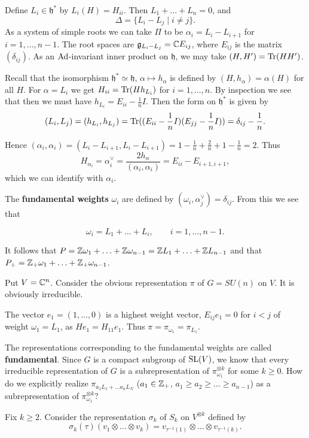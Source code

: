 \documentclass[11pt, english]{article}
\begin{document}
Define $L_i \in \mathfrak{h}^\ast$ by $L_i(H)=H_{ii}$. Then $L_1+\ldots+L_n=0$, and
$$
\Delta = \{ L_i - L_j \mid i \neq j \}.
$$
As a system of simple roots we can take $\Pi$ to be $\alpha_i= L_i-L_{i+1}$ for $i=1,\ldots,n-1$. The root spaces are $\mathfrak g_{L_i-L_j} = \mathbb{C} E_{ij}$, where $E_{ij}$ is the matrix $(\delta_{ij})$. As an $\operatorname{Ad}$-invariant inner product on $\mathfrak h$, we may take $(H,H') = \operatorname{Tr}(HH')$. 

Recall that the isomorphism $\mathfrak h^\ast \simeq \mathfrak h$, $\alpha \mapsto h_\alpha$ is defined by $(H,h_\alpha)=\alpha(H)$ for all $H$. For $\alpha=L_i$ we get $H_{ii} = \operatorname{Tr}(H h_{L_i})$ for $i=1,\ldots,n$. By inspection we see that then we must have $h_{L_i} = E_{ii} - \frac{1}{n}I$. Then the form on $\mathfrak h^\ast$ is given by 
$$
(L_i, L_j) = (h_{L_i}, h_{L_j}) = \operatorname{Tr}( (E_{ii} - \frac 1n I)(E_{jj} - \frac 1n I)) = \delta_{ij} - \frac 1n.
$$

Hence $(\alpha_i,\alpha_i)=(L_i-L_{i+1},L_i-L_{i+1}) = 1-\frac 1n + \frac 2n +1 -\frac 1n=2$. Thus
$$
H_{\alpha_i} = \alpha_i^\vee = \frac{2 h_\alpha}{(\alpha_i,\alpha_i)}=E_{ii}-E_{i+1,i+1},
$$
which we can identify with $\alpha_i$.

The \textbf{fundamental weights} $\omega_i$ are defined by $(\omega_i, \alpha_j^\vee)= \delta_{ij}$. From this we see that 

$$
\omega_i = L_1+ \ldots+ L_{i}, \qquad i=1,\ldots, n-1.
$$

It follows that $P = \mathbb{Z} \omega_1 + \ldots + \mathbb{Z} \omega_{n-1} = \mathbb{Z} L_1 + \ldots + \mathbb{Z} L_{n-1}$ and that $P_+ = \mathbb{Z}_+ \omega_1 + \ldots + \mathbb{Z}_+ \omega_{n-1}$. 

Put $V = \mathbb{C}^n$. Consider the obvious representation $\pi$ of $G=SU(n)$ on $V$. It is obviously irreducible.

The vector $e_1=(1,\ldots,0)$ is a highest weight vector, $E_{ij} e_1 = 0$ for $ i< j$ of weight $\omega_1 = L_1$, as $H e_1 = H_{11} e_1$. Thus $\pi = \pi_{\omega_1} = \pi_{L_1}$. 

The representations corresponding to the fundamental weights are called \textbf{fundamental}. Since $G$ is a compact subgroup of $\operatorname{SL}(V)$, we know that every irreducible representation of $G$ is a subrepresentation of $\pi_{\omega_1}^{\otimes k}$ for some $k \geq 0$. How do we explicitly realize $\pi_{a_1L_1 + \ldots a_n L_N}$ ($a_1 \in \mathbb{Z}_+$, $a_1 \geq a_2 \geq \ldots \geq a_{n-1}$) as a subrepresentation of $\pi_{\omega_1}^{\otimes k}$? 

Fix $k \geq 2$. Consider the representation $\sigma_k$ of $S_k$ on $V^{\otimes k}$ defined by
$$
\sigma_k(\tau)(v_1 \otimes \ldots \otimes v_k) = v_{\tau^{-1}(1)} \otimes \ldots \otimes v_{\tau^{-1}(k)}.
$$
\end{document}
